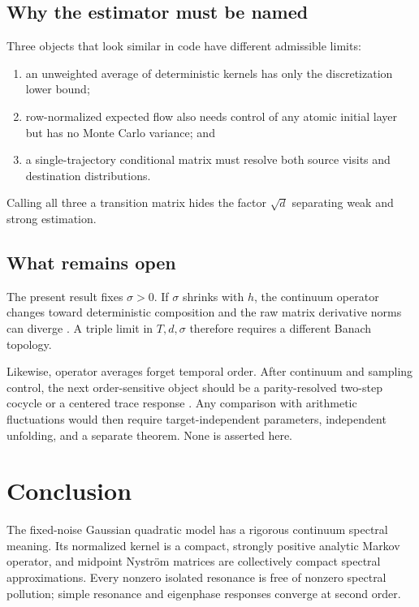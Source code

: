 \documentclass[11pt]{article}
\theoremstyle{definition}
\theoremstyle{remark}
\begin{document}
\subsection{Why the estimator must be named}

Three objects that look similar in code have different admissible limits:
\begin{enumerate}[label=(\roman*),leftmargin=2.2em]
  \item an unweighted average of deterministic kernels has only the
  discretization lower bound;
  \item row-normalized expected flow also needs control of any atomic initial
  layer but has no Monte Carlo variance; and
  \item a single-trajectory conditional matrix must resolve both source visits
  and destination distributions.
\end{enumerate}
Calling all three a transition matrix hides the factor $\sqrt d$ separating
weak and strong estimation.

\subsection{What remains open}

The present result fixes $\sigma>0$.  If $\sigma$ shrinks with $h$, the
continuum operator changes toward deterministic composition and the raw
matrix derivative norms can diverge \citep{WangGaussianResponse2026}.  A
triple limit in $T,d,\sigma$ therefore requires a different Banach topology.

Likewise, operator averages forget temporal order.  After continuum and
sampling control, the next order-sensitive object should be a parity-resolved
two-step cocycle or a centered trace response
\citep{WangParity2026}.  Any comparison with arithmetic fluctuations would
then require target-independent parameters, independent unfolding, and a
separate theorem.  None is asserted here.

\section{Conclusion}

The fixed-noise Gaussian quadratic model has a rigorous continuum spectral
meaning.  Its normalized kernel is a compact, strongly positive analytic
Markov operator, and midpoint Nystr\"om matrices are collectively compact
spectral approximations.  Every nonzero isolated resonance is free of
nonzero spectral pollution; simple resonance and eigenphase responses converge
at second order.
\end{document}
